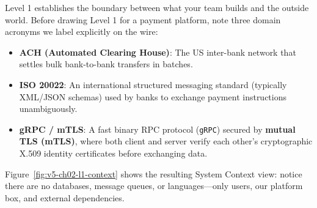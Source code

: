 Level 1 establishes the boundary between what your team builds and the outside world. Before drawing Level 1 for a payment platform, note three domain acronyms we label explicitly on the wire:
\begin{itemize}[leftmargin=18pt]
  \item \textbf{ACH (Automated Clearing House)}: The US inter-bank network that settles bulk bank-to-bank transfers in batches.
  \item \textbf{ISO 20022}: An international structured messaging standard (typically XML/JSON schemas) used by banks to exchange payment instructions unambiguously.
  \item \textbf{gRPC / mTLS}: A fast binary RPC protocol (\texttt{gRPC}) secured by \textbf{mutual TLS (mTLS)}, where both client and server verify each other's cryptographic X.509 identity certificates before exchanging data.
\end{itemize}

Figure~\ref{fig:v5-ch02-l1-context} shows the resulting System Context view: notice there are no databases, message queues, or languages---only users, our platform box, and external dependencies.

